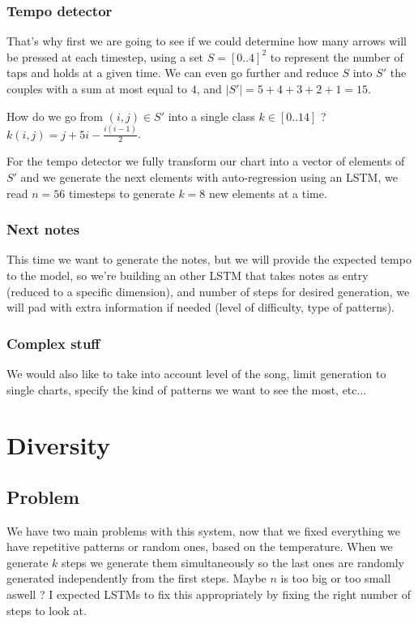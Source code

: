 \documentclass[11pt]{article}
\newcommand{\abs}[1]{\left\lvert #1 \right\rvert}
\begin{document}
\subsubsection{Tempo detector}
That's why first we are going to see if we could determine how many arrows will be pressed at each timestep, using a set $S = [0..4]^2$ to represent the number of taps and holds at a given time. We can even go further and reduce $S$ into $S'$ the couples with a sum at most equal to $4$, and $\abs{S'} = 5+4+3+2+1 = 15$.

How do we go from $(i,j) \in S'$ into a single class $k \in [0..14]$ ? $k(i,j) = j + 5i - \frac{i(i-1)}{2}$. 


For the tempo detector we fully transform our chart into a vector of elements of $S'$ and we generate the next elements with auto-regression using an LSTM, we read $n=56$ timesteps to generate $k=8$ new elements at a time. 

\subsubsection{Next notes}
This time we want to generate the notes, but we will provide the expected tempo to the model, so we're building an other LSTM that takes notes as entry (reduced to a specific dimension), and number of steps for desired generation, we will pad with extra information if needed (level of difficulty, type of patterns). 

\subsubsection{Complex stuff}
We would also like to take into account level of the song, limit generation to single charts, specify the kind of patterns we want to see the most, etc...

\newpage
\section{Diversity}
\subsection{Problem}
We have two main problems with this system, now that we fixed everything we have repetitive patterns or random ones, based on the temperature. When we generate $k$ steps we generate them simultaneously so the last ones are randomly generated independently from the first steps. Maybe $n$ is too big or too small aswell ? I expected LSTMs to fix this appropriately by fixing the right number of steps to look at. 


	
\end{document}

